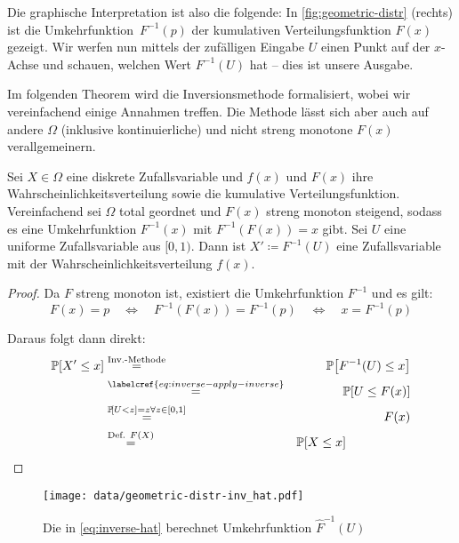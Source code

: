 Die graphische Interpretation ist also die folgende:
In \cref{fig:geometric-distr} (rechts) ist die Umkehrfunktion~$F^{-1}(p)$ der kumulativen Verteilungsfunktion $F(x)$ gezeigt.
Wir werfen nun mittels der zufälligen Eingabe $U$ einen Punkt auf der $x$-Achse und schauen, welchen Wert $F^{-1}(U)$ hat -- dies ist unsere Ausgabe.

Im folgenden Theorem wird die Inversionsmethode formalisiert, wobei wir vereinfachend einige Annahmen treffen.
Die Methode lässt sich aber auch auf andere $\Omega$ (inklusive kontinuierliche) und nicht streng monotone $F(x)$ verallgemeinern.

\begin{theorem}
    Sei $X \in \Omega$ eine diskrete Zufallsvariable und $f(x)$ und $F(x)$ ihre Wahrscheinlichkeitsverteilung sowie die kumulative Verteilungsfunktion.
    Vereinfachend sei $\Omega$ total geordnet und $F(x)$ streng monoton steigend, sodass es eine Umkehrfunktion $F^{-1}(x)$ mit $F^{-1}(F(x)) = x$ gibt.
    Sei $U$ eine uniforme Zufallsvariable aus $[0, 1)$.
    Dann ist $X' \coloneqq F^{-1}(U)$ eine Zufallsvariable mit der Wahrscheinlichkeitsverteilung $f(x)$.
\end{theorem}

\begin{proof}
    \noindent Da $F$ streng monoton ist, existiert die Umkehrfunktion $F^{-1}$ und es gilt:
    \begin{equation}\label{eq:inverse-apply-inverse}
        F(x) = p
        \quad\Leftrightarrow\quad F^{-1}(F(x)) = F^{-1}(p)
        \quad\Leftrightarrow\quad x = F^{-1}(p)
    \end{equation}

    \noindent Daraus folgt dann direkt:
    \begin{eqnarray}
        \prob{X' \le x} &\stackrel{\text{Inv.-Methode}} = & \prob{F^{-1}(U) \le x} \\
        &\stackrel{\labelcref{eq:inverse-apply-inverse}}{=}& \prob{U \le F(x)} \\
        &\stackrel{\prob{U < z} = z \forall z \in [0, 1]}=& F(x) \\
        &\stackrel{\text{Def. } F(X)}=& \prob{X \le x} \hspace{5em}\hfill \qedhere
    \end{eqnarray}
\end{proof}

\bigskip
\bigskip

\begin{figure}
    \begin{center}
        \texttt{[image: data/geometric-distr-inv\_hat.pdf]}
    \end{center}
    \caption{Die in \cref{eq:inverse-hat} berechnet Umkehrfunktion $\hat F^{-1}(U)$}

\end{figure}

